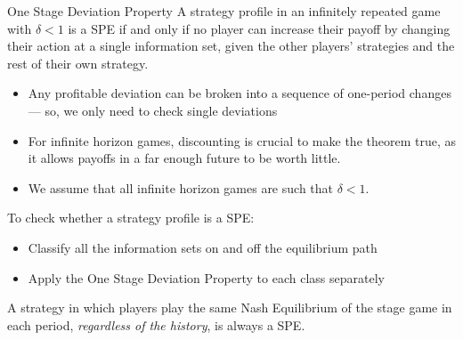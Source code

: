 \documentclass[10pt]{extarticle}
\begin{document}
  \begin{problem}{One Stage Deviation Property}
    A strategy profile in an infinitely repeated game with $\delta < 1$ is a SPE if and only if no player can increase their payoff by changing their action at a single information set, given the other players' strategies and the rest of their own strategy.
    \begin{itemize}
      \item Any profitable deviation can be broken into a sequence of one-period changes --- so, we only need to check single deviations
      \item For infinite horizon games, discounting is crucial to make the theorem true, as it allows payoffs in a far enough future to be worth little.
      \item We assume that all infinite horizon games are such that $\delta < 1$.
    \end{itemize}
    To check whether a strategy profile is a SPE:
    \begin{itemize}
      \item Classify all the information sets on and off the equilibrium path
      \item Apply the One Stage Deviation Property to each class separately
    \end{itemize}
    A strategy in which players play the same Nash Equilibrium of the stage game in each period, \textit{regardless of the history}, is always a SPE.
  \end{problem}
\end{document}
